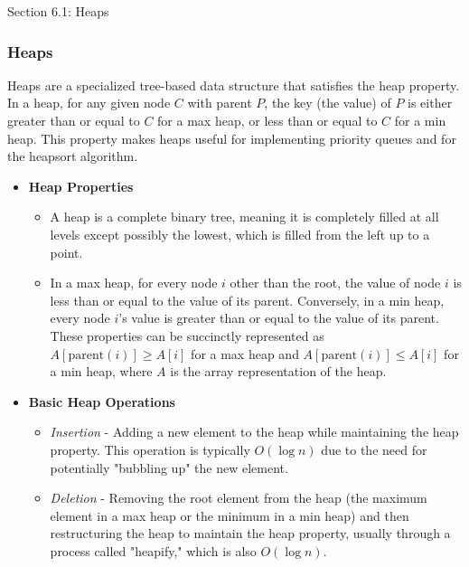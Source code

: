 \begin{notes}{Section 6.1: Heaps}
    \subsubsection*{Heaps}

    Heaps are a specialized tree-based data structure that satisfies the heap property. In a heap, for any given node $C$ with parent $P$, the key (the value) of $P$ is either greater than or equal 
    to $C$ for a max heap, or less than or equal to $C$ for a min heap. This property makes heaps useful for implementing priority queues and for the heapsort algorithm.
    
    \begin{itemize}
        \item \textbf{Heap Properties}
        \begin{itemize}
            \item A heap is a complete binary tree, meaning it is completely filled at all levels except possibly the lowest, which is filled from the left up to a point.
            \item In a max heap, for every node $i$ other than the root, the value of node $i$ is less than or equal to the value of its parent. Conversely, in a min heap, every node $i$'s value is 
            greater than or equal to the value of its parent. These properties can be succinctly represented as $A[\text{parent}(i)] \geq A[i]$ for a max heap and $A[\text{parent}(i)] \leq A[i]$ 
            for a min heap, where $A$ is the array representation of the heap.
        \end{itemize}
        
        \item \textbf{Basic Heap Operations}
        \begin{itemize}
            \item \emph{Insertion} - Adding a new element to the heap while maintaining the heap property. This operation is typically $O(\log n)$ due to the need for potentially "bubbling up" the 
            new element.
            \item \emph{Deletion} - Removing the root element from the heap (the maximum element in a max heap or the minimum in a min heap) and then restructuring the heap to maintain the heap 
            property, usually through a process called "heapify," which is also $O(\log n)$.
        \end{itemize}
    \end{itemize}
    

\end{notes}
